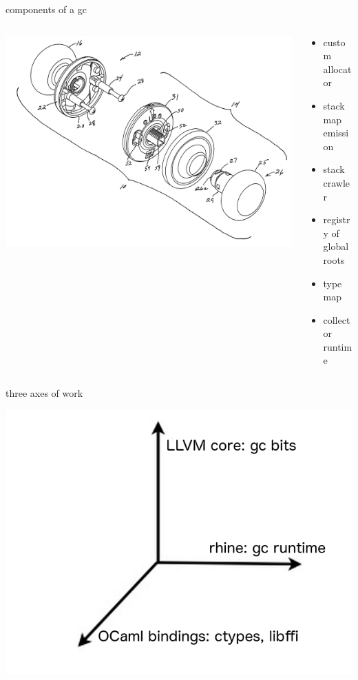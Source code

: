 \documentclass{beamer}
\begin{document}
\begin{frame}{components of a gc}
  \begin{columns}
    \begin{column}[b]{4.5cm}
      \includegraphics[scale=0.04]{components}
    \end{column}
    \begin{column}[b]{5.5cm}
      \begin{itemize}
      \item[] custom allocator
      \item[] stack map emission
      \item[] stack crawler
      \item[] registry of global roots
      \item[] type map
      \item[] collector runtime
      \end{itemize}
    \end{column}
  \end{columns}
\end{frame}

\begin{frame}{three axes of work}
  \begin{center}\includegraphics[scale=0.3]{xyz-axes}\end{center}
\end{frame}
\end{document}
